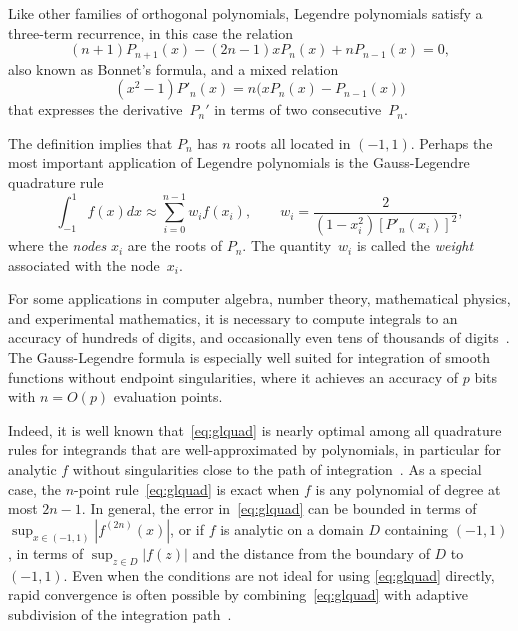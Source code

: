 \documentclass[11pt,a4paper]{article}
\begin{document}
Like other families of orthogonal polynomials, Legendre polynomials
satisfy a three-term recurrence, in this case the relation
\begin{equation} \label{eq:recurrence}
  (n + 1) P_{n+1}(x) - (2n - 1) x P_n(x) + n P_{n-1}(x) = 0,
\end{equation}
also known as Bonnet's formula, and a mixed relation
\begin{equation} \label{eq:mixed}
  (x^2 - 1) P'_n(x) = n \bigl( x P_n(x) - P_{n-1}(x) \bigl)
\end{equation}
that expresses the derivative $P_n'$ in terms of two
consecutive $P_n$.

The definition implies that $P_n$ has $n$ roots all located in $(-1,1)$.
Perhaps the most important application of Legendre polynomials
is the Gauss-Legendre quadrature rule
\begin{equation}
\int_{-1}^{1} f(x) dx \approx \sum_{i=0}^{n-1} w_i f(x_i), \qquad
w_i = \frac{2}{(1-x_i^2) [P'_n(x_i)]^2},
\label{eq:glquad}
\end{equation}
where the \emph{nodes} $x_i$ are the roots of $P_n$.
The quantity~$w_i$ is called the \emph{weight} associated
with the node~$x_i$.

For some applications in computer algebra, number theory,
mathematical physics, and experimental mathematics,
it is necessary to compute integrals to an accuracy of
hundreds of digits, and occasionally even tens of
thousands of digits~\cite{bailey2011high}.
The Gauss-Legendre formula is especially well suited for
integration of smooth functions without endpoint singularities, where it
achieves an accuracy of $p$ bits with $n = O(p)$ evaluation points.

Indeed, it is well known that~\eqref{eq:glquad} is nearly optimal among
all quadrature rules for integrands that are
well-approximated by polynomials, in particular for
analytic $f$ without singularities close to
the path of integration~\cite{kowalski1985gauss,trefethen2008gauss}.
As a special case, the $n$-point rule~\eqref{eq:glquad} is exact
when $f$ is any polynomial of degree at most $2n-1$.
In general, the error in~\eqref{eq:glquad} can be bounded in terms of
$\sup_{x \in (-1,1)} |f^{(2n)}(x)|$, or if $f$ is analytic on a domain $D$
containing $(-1,1)$, in terms of $\sup_{z \in D} |f(z)|$
and the distance from the boundary of $D$ to $(-1,1)$.
Even when the conditions are not ideal for using \eqref{eq:glquad} directly,
rapid convergence is often possible
by combining~\eqref{eq:glquad}
with adaptive subdivision of the integration path~\cite{petras2002self}.
\end{document}
